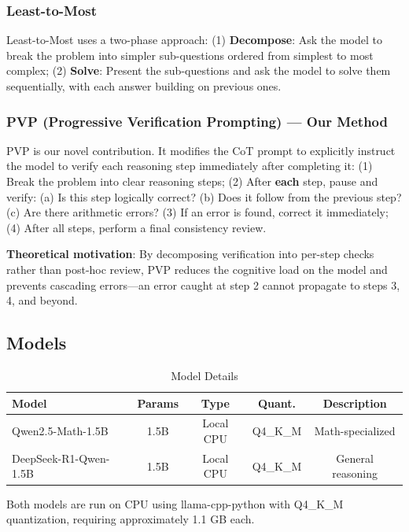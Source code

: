 \documentclass[conference]{IEEEtran}
\begin{document}
\subsubsection{Least-to-Most}
Least-to-Most uses a two-phase approach: (1) \textbf{Decompose}: Ask the model to break the problem into simpler sub-questions ordered from simplest to most complex; (2) \textbf{Solve}: Present the sub-questions and ask the model to solve them sequentially, with each answer building on previous ones.

\subsubsection{PVP (Progressive Verification Prompting) --- Our Method}
PVP is our novel contribution. It modifies the CoT prompt to explicitly instruct the model to verify each reasoning step immediately after completing it: (1) Break the problem into clear reasoning steps; (2) After \textbf{each} step, pause and verify: (a) Is this step logically correct? (b) Does it follow from the previous step? (c) Are there arithmetic errors? (3) If an error is found, correct it immediately; (4) After all steps, perform a final consistency review.

\textbf{Theoretical motivation}: By decomposing verification into per-step checks rather than post-hoc review, PVP reduces the cognitive load on the model and prevents cascading errors---an error caught at step 2 cannot propagate to steps 3, 4, and beyond.

\subsection{Models}

\begin{table}[h]
\centering
\caption{Model Details}
\label{tab:models}
\begin{tabular}{lcccc}
\toprule
\textbf{Model} & \textbf{Params} & \textbf{Type} & \textbf{Quant.} & \textbf{Description} \\
\midrule
Qwen2.5-Math-1.5B & 1.5B & Local CPU & Q4\_K\_M & Math-specialized \\
DeepSeek-R1-Qwen-1.5B & 1.5B & Local CPU & Q4\_K\_M & General reasoning \\
\bottomrule
\end{tabular}
\end{table}

Both models are run on CPU using llama-cpp-python with Q4\_K\_M quantization, requiring approximately 1.1 GB each.
\end{document}
